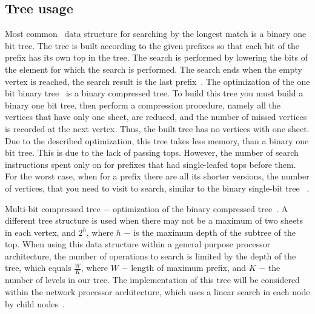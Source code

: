 \documentclass[conference]{IEEEtran}
\begin{document}
    \subsection{Tree usage}
        \label{section:bctrev}
            Most common~\cite{behdadfar2009scalar} data structure for searching by 
            the longest match is a binary one bit tree. 
            The tree is built according to the given prefixes so that each bit of the prefix has its own top in the tree. 
            The search is performed by lowering the bits of the element for which the search is performed. 
            The search ends when the empty vertex is reached, the search result is the last prefix~\cite{chao2007high:1}.
            The optimization of the one bit binary tree~\cite{ruiz2001survey} is a binary compressed tree. 
            To build this tree you must build a binary one bit tree, 
            then perform a compression procedure, namely all the vertices that have only one sheet, 
            are reduced, and the number of missed vertices is recorded at the next vertex. 
            Thus, the built tree has no vertices with one sheet. 
            Due to the described optimization, this tree takes less memory, 
            than a binary one bit tree. This is due to the lack of passing tops. 
            However, the number of search instructions spent only on 
            for prefixes that had single-leafed tops before them. For the worst case, when for a prefix there are all its shorter versions, the number of vertices, 
            that you need to visit to search, similar to the binary single-bit tree ~\cite{ruiz2001survey}. 

            Multi-bit compressed tree $-$ optimization of the binary compressed tree~\cite{berger2003ip}.
            A different tree structure is used when there may not be a maximum of two sheets in each vertex, 
            and {\ttfamily $2^h$}, where {\ttfamily $h$} $-$ is the maximum depth of the subtree of the top.
            When using this data structure within a general purpose processor architecture, 
            the number of operations to search is limited by the depth of the tree,
            which equals {\ttfamily $\frac{W}{K}$}, where {\ttfamily $W$} $-$ length of maximum prefix, 
            and {\ttfamily $K$} $-$ the number of levels in our tree.
            The implementation of this tree will be considered within the network processor architecture, 
            which uses a linear search in each node by child nodes~\cite{berger2003ip}.
                   
\end{document}
